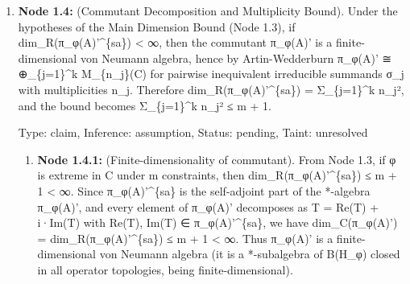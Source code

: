 \documentclass{article}
\begin{document}
\begin{enumerate}
\begin{enumerate}
  Type: claim, Inference: assumption, Status: pending, Taint: unresolved

\item \textbf{Node 1.3.4:} (Step 3: Algebraic conclusion). Combining Steps 1 and 2: dim\_R(π\_φ(A)'\textasciicircum{}\{sa\}) - 1 = dim(F\_\{S(A)\}(φ)) ≤ m. Therefore dim\_R(π\_φ(A)'\textasciicircum{}\{sa\}) ≤ m + 1. This completes the proof of part (I) of the main theorem.

  Type: claim, Inference: assumption, Status: validated, Taint: unresolved

\item \textbf{Node 1.3.5:} (Extension to inequality and mixed constraints). The same argument works for inequality constraints φ(a\_j) ≤ β\_j or mixed equality/inequality: the Weis-Shirokov theorem (Node 1.2) applies to both sublevel sets and level sets, and the inductive argument treats each constraint independently, whether it is an equality or inequality. Hence the bound dim\_R(π\_φ(A)'\textasciicircum{}\{sa\}) ≤ m + 1 holds for all three constraint types.

  Type: claim, Inference: assumption, Status: validated, Taint: unresolved

\end{enumerate}
\item \textbf{Node 1.4:} (Commutant Decomposition and Multiplicity Bound). Under the hypotheses of the Main Dimension Bound (Node 1.3), if dim\_R(π\_φ(A)'\textasciicircum{}\{sa\}) < ∞, then the commutant π\_φ(A)' is a finite-dimensional von Neumann algebra, hence by Artin-Wedderburn π\_φ(A)' ≅ ⊕\_\{j=1\}\textasciicircum{}k M\_\{n\_j\}(C) for pairwise inequivalent irreducible summands σ\_j with multiplicities n\_j. Therefore dim\_R(π\_φ(A)'\textasciicircum{}\{sa\}) = Σ\_\{j=1\}\textasciicircum{}k n\_j², and the bound becomes Σ\_\{j=1\}\textasciicircum{}k n\_j² ≤ m + 1.

  Type: claim, Inference: assumption, Status: pending, Taint: unresolved

\begin{enumerate}
\item \textbf{Node 1.4.1:} (Finite-dimensionality of commutant). From Node 1.3, if φ is extreme in C under m constraints, then dim\_R(π\_φ(A)'\textasciicircum{}\{sa\}) ≤ m + 1 < ∞. Since π\_φ(A)'\textasciicircum{}\{sa\} is the self-adjoint part of the *-algebra π\_φ(A)', and every element of π\_φ(A)' decomposes as T = Re(T) + i·Im(T) with Re(T), Im(T) ∈ π\_φ(A)'\textasciicircum{}\{sa\}, we have dim\_C(π\_φ(A)') = dim\_R(π\_φ(A)'\textasciicircum{}\{sa\}) ≤ m + 1 < ∞. Thus π\_φ(A)' is a finite-dimensional von Neumann algebra (it is a *-subalgebra of B(H\_φ) closed in all operator topologies, being finite-dimensional).


\end{enumerate}
\end{enumerate}
\end{document}

